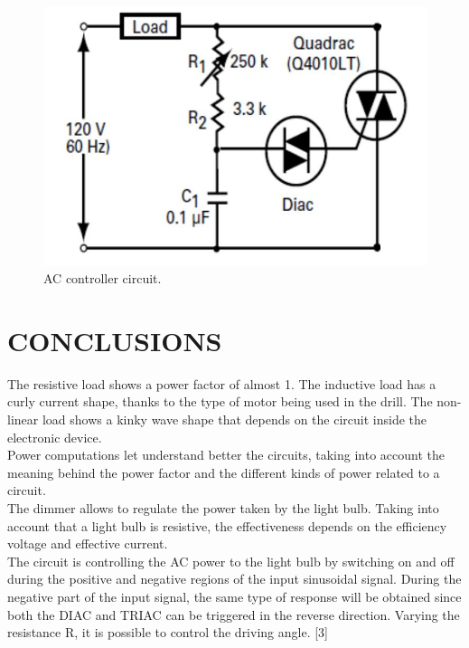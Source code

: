 \documentclass[journal]{IEEEtran}
\begin{document}
\begin{figure}[h]
\centering
\includegraphics[clip,width=\columnwidth]{controller.png}
\caption{AC controller circuit.}
\label{ACcontroller}
\end{figure}

\section{CONCLUSIONS}

The resistive load shows a power factor of almost 1. 
The inductive load has a curly current shape, thanks to 
the type of motor being used in the drill. The 
non-linear load shows a kinky wave shape that 
depends on the circuit inside the electronic device.\\

Power computations let understand better the 
circuits, taking into account the meaning behind the 
power factor and the different kinds of 
power related to a circuit.\\

The dimmer allows to regulate the power taken by the 
light bulb. Taking into account that a light bulb is 
resistive, the effectiveness depends on the efficiency 
voltage and effective current. \\

The circuit is controlling the AC power to the light bulb 
by switching on and off during the positive and negative 
regions of the input sinusoidal signal. During the 
negative part of the input signal, the same type of 
response will be obtained since both the DIAC and TRIAC 
can be triggered in the reverse direction. Varying the 
resistance R, it is possible to control the driving 
angle. [3]\\
\end{document}
